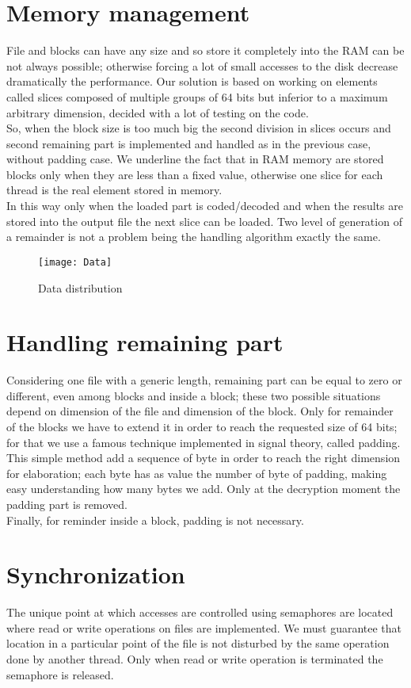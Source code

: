\section{Memory management}
File and blocks can have any size and so store it completely into the RAM can be not always possible; otherwise forcing a lot of small accesses to the disk decrease dramatically the performance. Our solution is based on working on elements called slices composed of multiple groups of 64 bits but inferior to a maximum arbitrary dimension, decided with a lot of testing on the code. \\
So, when the block size is too much big the second division in slices occurs and second remaining part is implemented and handled as in the previous case, without padding case. We underline the fact that in RAM memory are stored blocks only when they are less than a fixed value, otherwise one slice for each thread is the real element stored in memory.
\\
In this way only when the loaded part is coded/decoded and when the results are stored into the output file the next slice can be loaded. Two level of generation of a remainder is not a problem being the handling algorithm exactly the same.
\begin{figure}[!h]
 \centering
 \texttt{[image: Data]}
 \caption{Data distribution}
 \label{Fig:Data}
 \end{figure}
  \vspace{-14mm}
 \section{Handling remaining part}
Considering one file with a generic length, remaining part can be equal to zero or different, even among blocks and inside a block; these two possible situations depend on dimension of the file and dimension of the block. Only for remainder of the blocks we have to extend it in order to reach the requested size of 64 bits; for that we use a famous technique implemented in signal theory, called padding. This simple method add a sequence of byte in order to reach the right dimension for elaboration; each byte has as value the number of byte of padding, making easy understanding how many bytes we add. Only at the decryption moment the padding part is removed.
\\
Finally, for reminder inside a block, padding is not necessary.
 \section{Synchronization}
The unique point at which accesses are controlled using semaphores are located where read or write operations on files are implemented. We must guarantee that location in a particular point of the file is not disturbed by the same operation done by another thread. Only when read or write operation is terminated the semaphore is released.